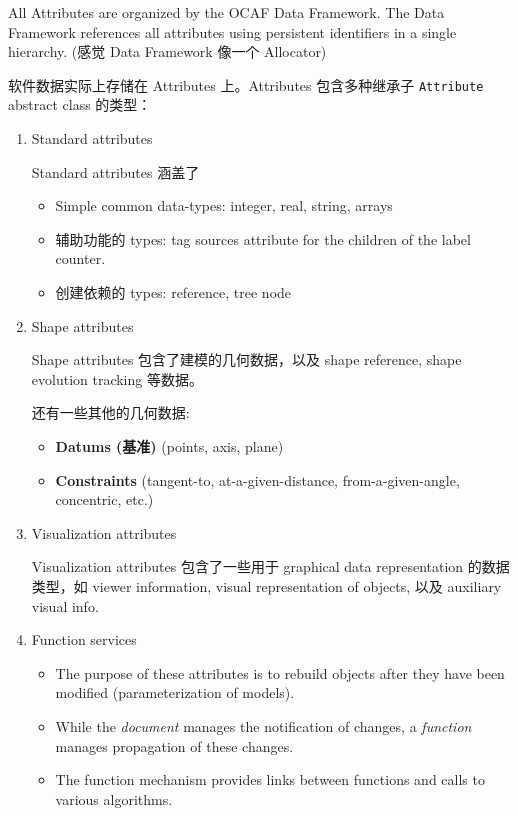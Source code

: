 \documentclass[11pt]{article}
\begin{document}
All Attributes are organized by the OCAF Data Framework. The Data Framework references all attributes using persistent identifiers in a single hierarchy. (感觉 Data Framework 像一个 Allocator)

软件数据实际上存储在 Attributes 上。Attributes 包含多种继承子 \texttt{Attribute} abstract class 的类型：
\begin{enumerate}
\item Standard attributes
\label{sec:org28f0579}

Standard attributes 涵盖了

\begin{itemize}
\item Simple common data-types: integer, real, string, arrays
\item 辅助功能的 types: tag sources attribute for the children of the label counter.
\item 创建依赖的 types: reference, tree node
\end{itemize}
\item Shape attributes
\label{sec:orgf1df24e}

Shape attributes 包含了建模的几何数据，以及 shape reference, shape evolution tracking 等数据。

还有一些其他的几何数据:
\begin{itemize}
\item \textbf{Datums (基准)} (points, axis, plane)
\item \textbf{Constraints} (tangent-to, at-a-given-distance, from-a-given-angle, concentric, etc.)
\end{itemize}
\item Visualization attributes
\label{sec:org8368571}

Visualization attributes 包含了一些用于 graphical data representation 的数据类型，如 viewer information, visual representation of objects, 以及 auxiliary visual info.
\item Function services
\label{sec:org4b7b39e}

\begin{itemize}
\item The purpose of these attributes is to rebuild objects after they have been modified (parameterization of models).
\item While the \emph{document} manages the notification of changes, a \emph{function} manages propagation of these changes.
\item The function mechanism provides links between functions and calls to various algorithms.
\end{itemize}
\end{enumerate}
\end{document}
